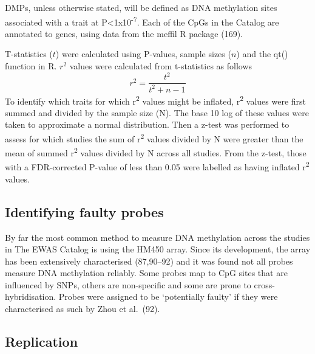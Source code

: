 \documentclass[11pt,twoside]{bristolthesis}
\begin{document}
DMPs, unless otherwise stated, will be defined as DNA methylation sites associated with a trait at P\textless1x10\textsuperscript{-7}. Each of the CpGs in the Catalog are annotated to genes, using data from the meffil R package (169).

T-statistics (\(t\)) were calculated using P-values, sample sizes (\(n\)) and the qt() function in R. \(r^2\) values were calculated from t-statistics as follows
\begin{equation}
    r^2 = \frac{t^2} {t^2 + n - 1}
    \label{eq:r-squared}
\end{equation}
To identify which traits for which r\textsuperscript{2} values might be inflated, r\textsuperscript{2} values were first summed and divided by the sample size (N). The base 10 log of these values were taken to approximate a normal distribution. Then a z-test was performed to assess for which studies the sum of r\textsuperscript{2} values divided by N were greater than the mean of summed r\textsuperscript{2} values divided by N across all studies. From the z-test, those with a FDR-corrected P-value of less than 0.05 were labelled as having inflated r\textsuperscript{2} values.

\hypertarget{identifying-faulty-probes}{%
\subsection{Identifying faulty probes}\label{identifying-faulty-probes}}

By far the most common method to measure DNA methylation across the studies in The EWAS Catalog is using the HM450 array. Since its development, the array has been extensively characterised (87,90--92) and it was found not all probes measure DNA methylation reliably. Some probes map to CpG sites that are influenced by SNPs, others are non-specific and some are prone to cross-hybridisation. Probes were assigned to be `potentially faulty' if they were characterised as such by Zhou et al.~(92).

\hypertarget{replication-methods-04}{%
\subsection{Replication}\label{replication-methods-04}}
\end{document}
